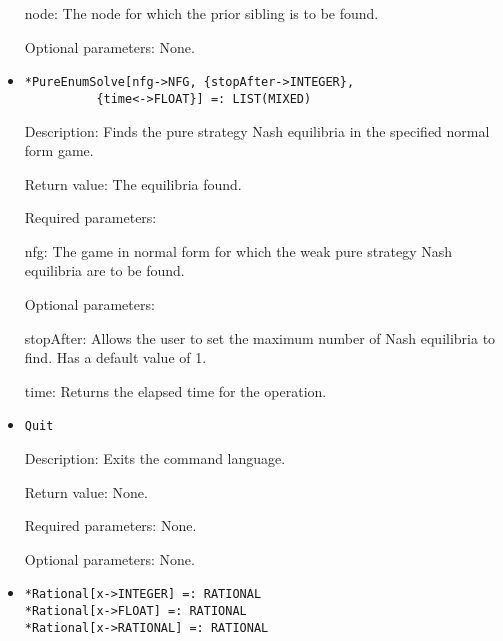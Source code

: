 \begin{itemize}
\bd
\item
[node:] The node for which the prior sibling is to be found.
\ed

\item
[Optional parameters:] None.
\ed


\item
\protect \large \begin{verbatim}
*PureEnumSolve[nfg->NFG, {stopAfter->INTEGER}, 
          {time<->FLOAT}] =: LIST(MIXED) 
\end{verbatim}\normalsize

\bd
\item
[Description:] Finds the pure strategy Nash equilibria in the
specified normal form game.  
\item
[Return value:] The equilibria
found.  
\item
[Required parameters:]\hfil\null
	
\bd
\item
[nfg:] The game in normal form for which the weak pure strategy Nash
equilibria are to be found.
\ed

\item
[Optional parameters:]\hfil\null
	
\bd
\item
[stopAfter:] Allows the user to set the maximum number of Nash equilibria to
find.  Has a default value of 1.
\item
[time:] Returns the elapsed time for the operation.
\ed
\ed

\item


\protect \large \begin{verbatim}
Quit
\end{verbatim}\normalsize

\bd

\item
[Description:] Exits the command language.
\item
[Return value:] None.
\item
[Required parameters:] None.
\item
[Optional parameters:] None.
\ed


\item
\protect \large \begin{verbatim}
*Rational[x->INTEGER] =: RATIONAL
*Rational[x->FLOAT] =: RATIONAL
*Rational[x->RATIONAL] =: RATIONAL
\end{verbatim} \normalsize



\end{itemize}
